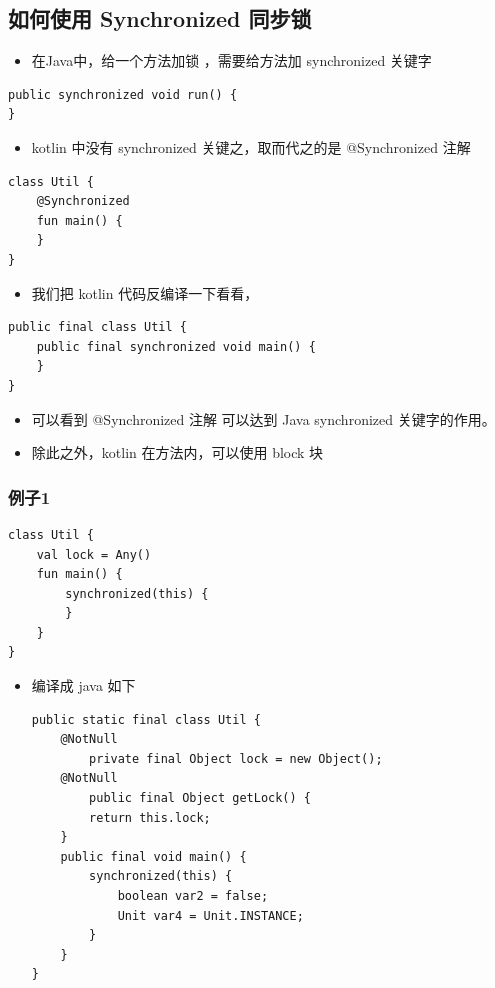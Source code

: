 \documentclass[9pt, b5paper]{article}
\begin{document}
\subsection{如何使用 Synchronized 同步锁}
\label{sec-6-2}
\begin{itemize}
\item 在Java中，给一个方法加锁 ，需要给方法加 synchronized 关键字
\end{itemize}
\begin{verbatim}
public synchronized void run() {
}
\end{verbatim}
\begin{itemize}
\item kotlin 中没有 synchronized 关键之，取而代之的是 @Synchronized 注解
\end{itemize}
\begin{verbatim}
class Util {
    @Synchronized
    fun main() {
    }
}
\end{verbatim}
\begin{itemize}
\item 我们把 kotlin 代码反编译一下看看，
\end{itemize}
\begin{verbatim}
public final class Util {
    public final synchronized void main() {
    }
}
\end{verbatim}
\begin{itemize}
\item 可以看到 @Synchronized 注解 可以达到 Java synchronized 关键字的作用。
\item 除此之外，kotlin 在方法内，可以使用 block 块
\end{itemize}
\subsubsection{例子1}
\label{sec-6-2-1}
\begin{verbatim}
class Util {
    val lock = Any()
    fun main() {
        synchronized(this) {
        }
    }
}
\end{verbatim}
\begin{itemize}
\item 编译成 java 如下
\begin{verbatim}
public static final class Util {
    @NotNull
        private final Object lock = new Object();
    @NotNull
        public final Object getLock() {
        return this.lock;
    }
    public final void main() {
        synchronized(this) {
            boolean var2 = false;
            Unit var4 = Unit.INSTANCE;
        }
    }
}
\end{verbatim}
\end{itemize}
\end{document}

